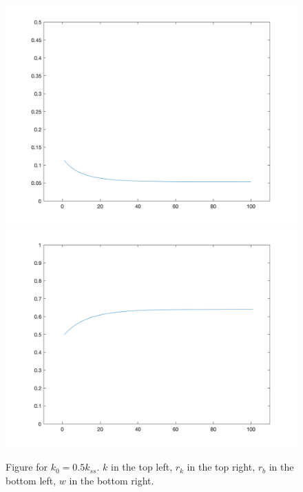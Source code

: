 \documentclass[10pt,letter]{article}
\begin{document}
\begin{figure}
\includegraphics[scale=0.2]{ps2q3_4r_b1}
\includegraphics[scale=0.2]{ps2q3_4w1}
\caption{
Figure for $k_0 = 0.5 k_{ss}$. $k$ in the top left, $r_k$ in the top right, $r_b$ in the bottom left, $w$ in the bottom right.
}
\end{figure}
\end{document}
